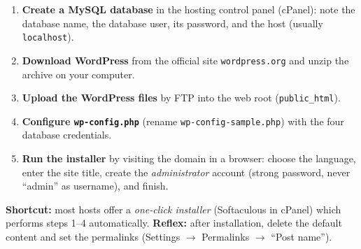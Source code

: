 \documentclass[11pt]{article}
\begin{document}
\begin{methode}
\begin{enumerate}
\item \textbf{Create a MySQL database} in the hosting control panel (cPanel): note the database name, the database user, its password, and the host (usually \texttt{localhost}).
\item \textbf{Download WordPress} from the official site \texttt{wordpress.org} and unzip the archive on your computer.
\item \textbf{Upload the WordPress files} by FTP into the web root (\texttt{public\_html}).
\item \textbf{Configure \texttt{wp-config.php}} (rename \texttt{wp-config-sample.php}) with the four database credentials.
\item \textbf{Run the installer} by visiting the domain in a browser: choose the language, enter the site title, create the \emph{administrator} account (strong password, never ``admin'' as username), and finish.
\end{enumerate}
\textbf{Shortcut:} most hosts offer a \emph{one-click installer} (Softaculous in cPanel) which performs steps 1--4 automatically. \textbf{Reflex:} after installation, delete the default content and set the permalinks (Settings $\rightarrow$ Permalinks $\rightarrow$ ``Post name'').
\end{methode}
\end{document}
